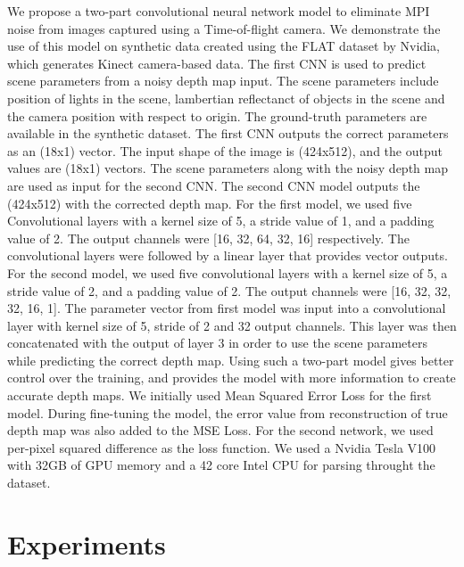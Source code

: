 \documentclass[runningheads]{llncs}
\begin{document}
We propose a two-part convolutional neural network model to eliminate MPI noise from images captured using a Time-of-flight camera. 
We demonstrate the use of this model on synthetic data created using the FLAT dataset by Nvidia, which generates Kinect camera-based data. 
\newline
\newline
The first CNN is used to predict scene parameters from a noisy depth map input. The scene parameters include position of lights in the scene, lambertian reflectanct of objects in the scene and the camera position with respect to origin. The ground-truth parameters are available in the synthetic dataset. The first CNN outputs the correct parameters as an (18x1) vector. The input shape of the image is (424x512), and the output values are (18x1) vectors. The scene parameters along with the noisy depth map are used as input for the second CNN. The second CNN model outputs the (424x512) with the corrected depth map.
\newline For the first model, we used five Convolutional layers with a kernel size of 5, a stride value of 1, and a padding value of 2. The output channels were [16, 32, 64, 32, 16] respectively. The convolutional layers were followed by a linear layer that provides vector outputs.
\newline
For the second model, we used five convolutional layers with a kernel size of 5, a stride value of 2, and a padding value of 2. The output channels were [16, 32, 32, 32, 16, 1]. The parameter vector from first model was input into a convolutional layer with kernel size of 5, stride of 2 and 32 output channels. This layer was then concatenated with the output of layer 3 in order to use the scene parameters while predicting the correct depth map.
Using such a two-part model gives better control over the training, and provides the model with more information to create accurate depth maps. We initially used Mean Squared Error Loss for the first model. During fine-tuning the model, the error value from reconstruction of true depth map was also added to the MSE Loss. For the second network, we used per-pixel squared difference as the loss function. We used a Nvidia Tesla V100 with 32GB of GPU memory and a 42 core Intel CPU for parsing throught the dataset.



\section{Experiments}
\end{document}

